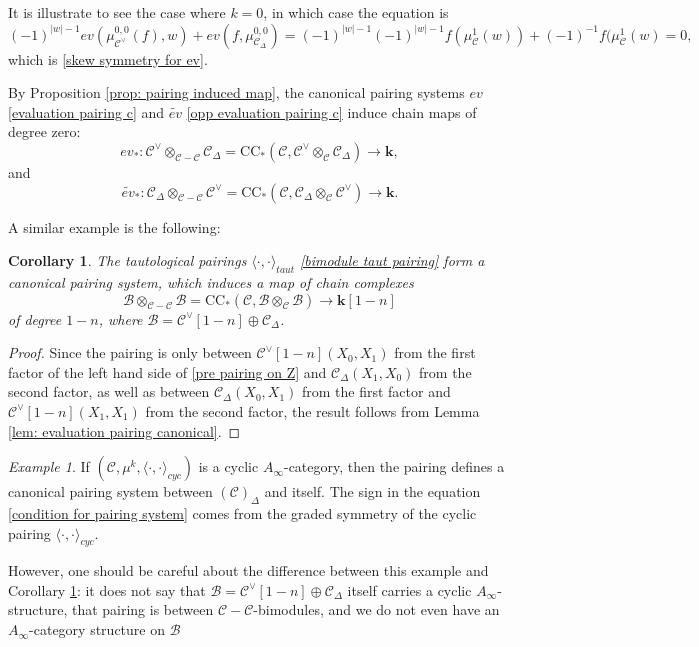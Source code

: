 \documentclass[11pt]{amsproc}
\def\K{{\mathbf{k}}}
\def\B{\mathcal{B}}
\def\cc{\mathcal{C}}
\def\r#1{\mathrm{#1}}
\def\D{\Delta}
\def\ainf{A_\infty}
\newtheorem{cor}[lem]{Corollary}
\theoremstyle{remark}
\newtheorem{example}{Example}[section]
\numberwithin{equation}{section}
\begin{document}
It is illustrate to see the case where $k=0$, in which case the equation is
\[
(-1)^{|w| - 1} ev(\mu^{0, 0}_{\cc^{\vee}}(f), w) + ev(f, \mu^{0, 0}_{\cc_{\D}}) = (-1)^{|w| - 1} (-1)^{|w| - 1} f(\mu^{1}_{\cc}(w)) + (-1)^{-1} f(\mu^{1}_{\cc}(w) = 0,
\]
which is \eqref{skew symmetry for ev}.


By Proposition \ref{prop: pairing induced map}, the canonical pairing systems $ev$ \eqref{evaluation pairing c} and $\tilde{ev}$ \eqref{opp evaluation pairing c} induce chain maps of degree zero:
\begin{equation}
ev_{*}: \cc^{\vee} \otimes_{\cc-\cc} \cc_{\D} = \r{CC}_{*}(\cc, \cc^{\vee} \otimes_{\cc} \cc_{\D}) \to \K,
\end{equation}
and
\begin{equation}
\tilde{ev}_{*}: \cc_{\D} \otimes_{\cc-\cc} \cc^{\vee} = \r{CC}_{*}(\cc, \cc_{\D} \otimes_{\cc} \cc^{\vee}) \to \K.
\end{equation}


A similar example is the following:

\begin{cor}\label{cor: taut pairing canonical}
The tautological pairings $\langle \cdot, \cdot \rangle_{taut}$ \eqref{bimodule taut pairing} form a canonical pairing system,
which induces a map of chain complexes 
\begin{equation}
\B \otimes_{\cc-\cc} \B = \r{CC}_{*}(\cc, \B \otimes_{\cc} \B) \to \K[1-n]
\end{equation}
of degree $1-n$, where $\B = \cc^{\vee}[1-n] \oplus \cc_{\D}$.
\end{cor}
\begin{proof}
Since the pairing is only between $\cc^{\vee}[1-n](X_{0}, X_{1})$ from the first factor of the left hand side of \eqref{pre pairing on Z} and $\cc_{\D}(X_{1}, X_{0})$ from the second factor,
as well as between $\cc_{\D}(X_{0}, X_{1})$ from the first factor and $\cc^{\vee}[1-n](X_{1}, X_{1})$ from the second factor,
the result follows from Lemma \ref{lem: evaluation pairing canonical}.
\end{proof}

\begin{example}
If $(\cc, \mu^{k}, \langle \cdot, \cdot \rangle_{cyc})$ is a cyclic $\ainf$-category,
then the pairing defines a canonical pairing system between $(\cc)_{\D}$ and itself.
The sign in the equation \eqref{condition for pairing system} comes from the graded symmetry of the cyclic pairing $\langle \cdot, \cdot \rangle_{cyc}$.

However, one should be careful about the difference between this example and Corollary \ref{cor: taut pairing canonical}:
it does not say that $\B = \cc^{\vee}[1-n] \oplus \cc_{\D}$ itself carries a cyclic $\ainf$-structure, 
that pairing is between $\cc-\cc$-bimodules, and we do not even have an $\ainf$-category structure on $\B$
\end{example}
\end{document}
